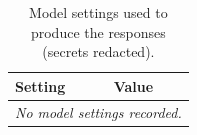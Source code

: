\begin{table}[H]
  \centering
  \begin{tabular}{@{}l p{10cm}@{}}
    \toprule
    \textbf{Setting} & \textbf{Value} \\
    \midrule
    \multicolumn{2}{c}{\textit{No model settings recorded.}} \\
    \bottomrule
  \end{tabular}
  \caption{Model settings used to produce the responses (secrets redacted).}
  \label{tab:model_settings}
\end{table}